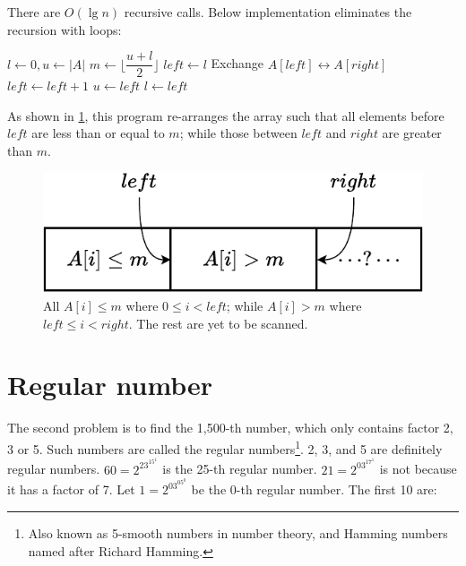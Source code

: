 \documentclass[b5paper]{article}
\begin{document}
There are $O(\lg n)$ recursive calls. Below implementation eliminates the recursion with loops:

\begin{algorithmic}[1]
  \State $l \gets 0, u \gets |A|$
    \State $m \gets \lfloor \dfrac{u + l}{2} \rfloor$
    \State $\textit{left} \gets l$
        \State Exchange $A[\textit{left}] \leftrightarrow A[right]$
        \State $\textit{left} \gets \textit{left} + 1$
      \EndIf
    \EndFor
      \State $u \gets \textit{left}$
    \Else
      \State $l \gets \textit{left}$
    \EndIf
  \EndWhile
\EndFunction
\end{algorithmic}

As shown in \cref{fig:divide}, this program re-arranges the array such that all elements before $\textit{left}$ are less than or equal to $m$; while those between $\textit{left}$ and $right$ are greater than $m$.

\begin{figure}[htbp]
  \centering
  \includegraphics[scale=0.7]{img/partition-by}
  \caption{All $A[i] \leq m$ where $0 \leq i < \textit{left}$; while $A[i] > m$ where $\textit{left} \leq i < right$. The rest are yet to be scanned.}
  \label{fig:divide}
\end{figure}

\section*{Regular number}

The second problem is to find the 1,500-th number, which only contains factor 2, 3 or 5. Such numbers are called the regular numbers\footnote{Also known as 5-smooth numbers in number theory, and Hamming numbers named after Richard Hamming.}. 2, 3, and 5 are definitely regular numbers. $60 = 2^23^15^1$ is the 25-th regular number. $21 = 2^03^17^1$ is not because it has a factor of 7. Let $1=2^03^05^0$ be the 0-th regular number. The first 10 are:
\end{document}
